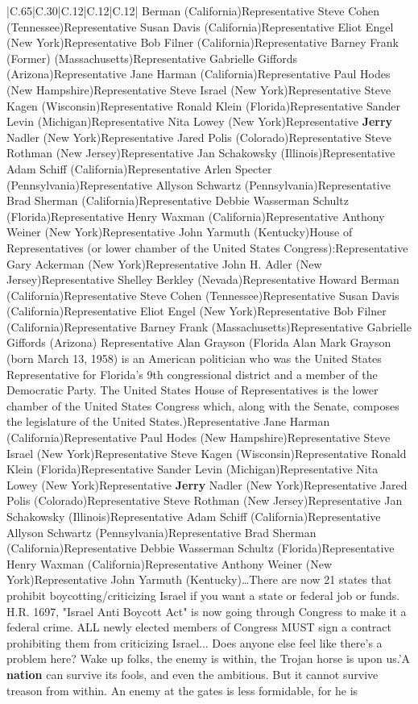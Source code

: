 \documentclass[11pt]{article}
\newlength\mylength
\begin{document}
\begin{center}
\begin{longtable}{|C{.65\mylength}|C{.30\mylength}|C{.12\mylength}|C{.12\mylength}|C{.12\mylength}|}
Berman (California)Representative Steve Cohen (Tennessee)Representative Susan Davis (California)Representative Eliot Engel (New York)Representative Bob Filner (California)Representative Barney Frank (Former) (Massachusetts)Representative Gabrielle Giffords (Arizona)Representative Jane Harman (California)Representative Paul Hodes (New Hampshire)Representative Steve Israel (New York)Representative Steve Kagen (Wisconsin)Representative Ronald Klein (Florida)Representative Sander Levin (Michigan)Representative Nita Lowey (New York)Representative \textbf{Jerry} Nadler (New York)Representative Jared Polis (Colorado)Representative Steve Rothman (New Jersey)Representative Jan Schakowsky (Illinois)Representative Adam Schiff (California)Representative Arlen Specter (Pennsylvania)Representative Allyson Schwartz (Pennsylvania)Representative Brad Sherman (California)Representative Debbie Wasserman Schultz (Florida)Representative Henry Waxman (California)Representative Anthony Weiner (New York)Representative John Yarmuth (Kentucky)House of Representatives (or lower chamber of the United States Congress):Representative Gary Ackerman (New York)Representative John H. Adler (New Jersey)Representative Shelley Berkley (Nevada)Representative Howard Berman (California)Representative Steve Cohen (Tennessee)Representative Susan Davis (California)Representative Eliot Engel (New York)Representative Bob Filner (California)Representative Barney Frank (Massachusetts)Representative Gabrielle Giffords (Arizona) Representative Alan Grayson (Florida Alan Mark Grayson (born March 13, 1958) is an American politician who was the United States Representative for Florida's 9th congressional district and a member of the Democratic Party. The United States House of Representatives is the lower chamber of the United States Congress which, along with the Senate, composes the legislature of the United States.)Representative Jane Harman (California)Representative Paul Hodes (New Hampshire)Representative Steve Israel (New York)Representative Steve Kagen (Wisconsin)Representative Ronald Klein (Florida)Representative Sander Levin (Michigan)Representative Nita Lowey (New York)Representative \textbf{Jerry} Nadler (New York)Representative Jared Polis (Colorado)Representative Steve Rothman (New Jersey)Representative Jan Schakowsky (Illinois)Representative Adam Schiff (California)Representative Allyson Schwartz (Pennsylvania)Representative Brad Sherman (California)Representative Debbie Wasserman Schultz (Florida)Representative Henry Waxman (California)Representative Anthony Weiner (New York)Representative John Yarmuth (Kentucky)…There are now 21 states that prohibit boycotting/criticizing Israel if you want a state or federal job or funds.  H.R. 1697, "Israel Anti Boycott Act" is now going through Congress to make it a federal crime.  ALL newly elected members of Congress MUST sign a contract prohibiting them from criticizing Israel...  Does anyone else feel like there's a problem here?  Wake up folks, the enemy is within, the Trojan horse is upon us.'A \textbf{nation} can survive its fools, and even the ambitious. But it cannot survive treason from within. An enemy at the gates is less formidable, for he is 
\end{longtable}
\end{center}
\end{document}
